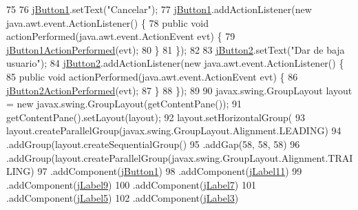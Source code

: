 \begin{DoxyCode}
75 
76         \mbox{\hyperlink{class_interfaz_package_1_1_informacion_cliente_aa7c801b9c192b73cd1b5a0d73a3a7de3}{jButton1}}.setText(\textcolor{stringliteral}{"Cancelar"});
77         \mbox{\hyperlink{class_interfaz_package_1_1_informacion_cliente_aa7c801b9c192b73cd1b5a0d73a3a7de3}{jButton1}}.addActionListener(\textcolor{keyword}{new} java.awt.event.ActionListener() \{
78             \textcolor{keyword}{public} \textcolor{keywordtype}{void} actionPerformed(java.awt.event.ActionEvent evt) \{
79                 \mbox{\hyperlink{class_interfaz_package_1_1_informacion_cliente_ac9bf2de6739f822e7b6bc9f933c3a058}{jButton1ActionPerformed}}(evt);
80             \}
81         \});
82 
83         \mbox{\hyperlink{class_interfaz_package_1_1_informacion_cliente_a18ab6870a03adb8b530c00f93ff9656b}{jButton2}}.setText(\textcolor{stringliteral}{"Dar de baja usuario"});
84         \mbox{\hyperlink{class_interfaz_package_1_1_informacion_cliente_a18ab6870a03adb8b530c00f93ff9656b}{jButton2}}.addActionListener(\textcolor{keyword}{new} java.awt.event.ActionListener() \{
85             \textcolor{keyword}{public} \textcolor{keywordtype}{void} actionPerformed(java.awt.event.ActionEvent evt) \{
86                 \mbox{\hyperlink{class_interfaz_package_1_1_informacion_cliente_abc5f4088b44b2ba167f13466732dec5c}{jButton2ActionPerformed}}(evt);
87             \}
88         \});
89 
90         javax.swing.GroupLayout layout = \textcolor{keyword}{new} javax.swing.GroupLayout(getContentPane());
91         getContentPane().setLayout(layout);
92         layout.setHorizontalGroup(
93             layout.createParallelGroup(javax.swing.GroupLayout.Alignment.LEADING)
94             .addGroup(layout.createSequentialGroup()
95                 .addGap(58, 58, 58)
96                 .addGroup(layout.createParallelGroup(javax.swing.GroupLayout.Alignment.TRAILING)
97                     .addComponent(\mbox{\hyperlink{class_interfaz_package_1_1_informacion_cliente_aa7c801b9c192b73cd1b5a0d73a3a7de3}{jButton1}})
98                     .addComponent(\mbox{\hyperlink{class_interfaz_package_1_1_informacion_cliente_a31fbf3562a8a9f5df8d2b5b19f2f9f76}{jLabel11}})
99                     .addComponent(\mbox{\hyperlink{class_interfaz_package_1_1_informacion_cliente_a03808e144608db738a13ec9eaa6d5559}{jLabel9}})
100                     .addComponent(\mbox{\hyperlink{class_interfaz_package_1_1_informacion_cliente_a43ed96cf07f28a71b91c6825e13023c3}{jLabel7}})
101                     .addComponent(\mbox{\hyperlink{class_interfaz_package_1_1_informacion_cliente_a12ceb5a1b4c467dfa98d98325d8ef848}{jLabel5}})
102                     .addComponent(\mbox{\hyperlink{class_interfaz_package_1_1_informacion_cliente_affc4d391ce9a4a138bb4ea1fc2fc23ec}{jLabel3}})

\end{DoxyCode}
